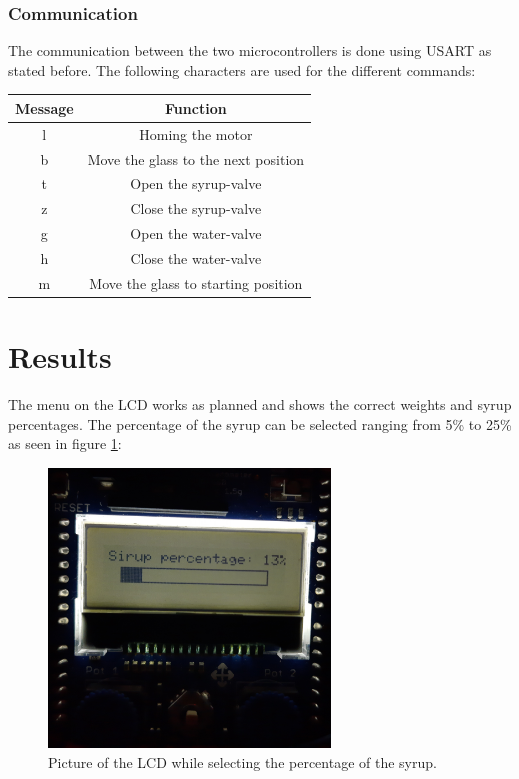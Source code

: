 \documentclass[twocolumn]{article}
\begin{document}
	\subsubsection{Communication}
	
	The communication between the two microcontrollers is done using USART as stated before. The following characters are used for the different commands: \newline\newline
	\begin{tabular}{|c|c|}
		\hline
		Message & Function \\ 
		\hline\hline 
		l &  Homing the motor\\ 
		\hline 
		b & Move the glass to the next position\\ 
		\hline 
		t&  Open the syrup-valve\\ 
		\hline 
		z&  Close the syrup-valve\\ 
		\hline 
		g& Open the water-valve \\ 
		\hline 
		h& Close the water-valve \\ 
	\hline 
		m& Move the glass to starting position \\ 
	\hline 
	\end{tabular} 
	
	\vspace*{5px}	
	
	
	\section{Results}
	The menu on the LCD works as planned and shows the correct weights and syrup percentages. The percentage of the syrup can be selected ranging from 5\% to 25\% as seen in figure \ref{fig5}:
	
	\begin{figure}[H]
		\centering
		\includegraphics[width=75mm]{lcd.jpg}
		\caption{Picture of the LCD while selecting the percentage of the syrup.}
		\label{fig5}
	\end{figure}
	
\end{document}
